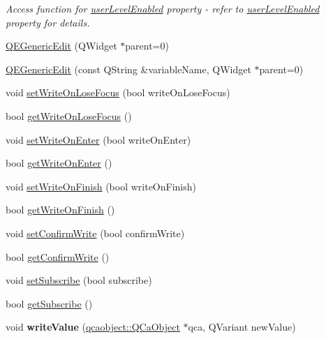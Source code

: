 \begin{DoxyCompactItemize}
\begin{DoxyCompactList}\small\item\em Access function for \hyperlink{classQEGenericEdit_ae18520d83fec62603db7e658efe00e3c}{userLevelEnabled} property -\/ refer to \hyperlink{classQEGenericEdit_ae18520d83fec62603db7e658efe00e3c}{userLevelEnabled} property for details. \end{DoxyCompactList}\item 
\hyperlink{classQEGenericEdit_aad24935d20ac13d05d79a7dac3619a2a}{QEGenericEdit} (QWidget $\ast$parent=0)
\item 
\hyperlink{classQEGenericEdit_a3a4960d3dd72d32329a6c02a5be2113c}{QEGenericEdit} (const QString \&variableName, QWidget $\ast$parent=0)
\item 
void \hyperlink{classQEGenericEdit_a49653dc548a0bfa35d8a34caabd21859}{setWriteOnLoseFocus} (bool writeOnLoseFocus)
\item 
bool \hyperlink{classQEGenericEdit_ae3e8108427c11e7199856793ed4197f1}{getWriteOnLoseFocus} ()
\item 
void \hyperlink{classQEGenericEdit_a1ac64f86c547d8196f6b6a9aad336ffd}{setWriteOnEnter} (bool writeOnEnter)
\item 
bool \hyperlink{classQEGenericEdit_a7e0ab81eb7b0826635cf546d9f25abef}{getWriteOnEnter} ()
\item 
void \hyperlink{classQEGenericEdit_aff9f621c2d7ec4e33e4b1ce5a99d0cf4}{setWriteOnFinish} (bool writeOnFinish)
\item 
bool \hyperlink{classQEGenericEdit_a8f9c3b15e14008c69c83fbb9e0cb1e71}{getWriteOnFinish} ()
\item 
void \hyperlink{classQEGenericEdit_a6925d54620cd6b7298b83a5867c23254}{setConfirmWrite} (bool confirmWrite)
\item 
bool \hyperlink{classQEGenericEdit_ae7da757a225d1b76ffee8e7d39ce4c79}{getConfirmWrite} ()
\item 
void \hyperlink{classQEGenericEdit_a3743dc52396cff2b7a1599a2845d682e}{setSubscribe} (bool subscribe)
\item 
bool \hyperlink{classQEGenericEdit_a4402bb99875a061dab8870b5d66eff1d}{getSubscribe} ()
\item 
\hypertarget{classQEGenericEdit_a5ce70de489d5618a3e5dc8d6bb6fc9f3}{
void {\bfseries writeValue} (\hyperlink{classqcaobject_1_1QCaObject}{qcaobject::QCaObject} $\ast$qca, QVariant newValue)}
\label{classQEGenericEdit_a5ce70de489d5618a3e5dc8d6bb6fc9f3}

\end{DoxyCompactItemize}
